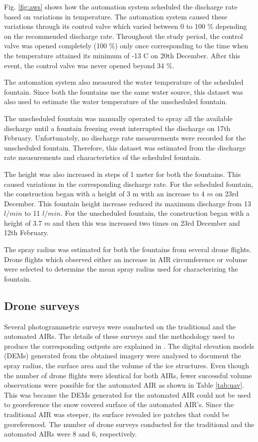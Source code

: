 \documentclass[tc, manuscript]{copernicus}
\begin{document}
Fig. \ref{fig:aws} shows how the automation system scheduled the discharge rate based on variations in
temperature. The automation system caused these variations through its control valve which varied between 0 to
100 \% depending on the recommended discharge rate. Throughout the study period, the control valve was opened
completely (100 \%) only once corresponding to the time when the temperature attained its minimum of -13 \degree
C on 20th December. After this event, the control valve was never opened beyond 34 \%.  

The automation system also measured the water temperature of the scheduled fountain. Since both the fountains
use the same water source, this dataset was also used to estimate the water temperature of the unscheduled
fountain.

The unscheduled fountain was manually operated to spray all the available discharge until a fountain freezing
event interrupted the discharge on 17th February. Unfortunately, no discharge rate measurements were recorded
for the unscheduled fountain. Therefore, this dataset was estimated from the discharge rate measurements and
characteristics of the scheduled fountain.

The height was also increased in steps of 1 meter for both the fountains. This caused variations in the
corresponding discharge rate. For the scheduled fountain, the construction began with a height of 3 m with an
increase to 4 $m$ on 23rd December. This fountain height increase reduced its maximum discharge from
13 $l/min$ to 11 $l/min$. For the unscheduled fountain, the construction began with a height of 3.7 $m$ and then
this was increased two times on 23rd December and 12th February.  

The spray radius was estimated for both the fountains from several drone flights. Drone flights which observed
either an increase in AIR circumference or volume were selected to determine the mean spray radius used for
characterizing the fountain.

\subsection{Drone surveys}

Several photogrammetric surveys were conducted on the traditional and the automated AIRs. The details of these
surveys and the methodology used to produce the corresponding outputs are explained in
\cite{balasubramanianInfluenceMeteorologicalConditions2022}. The digital elevation models (DEMs) generated from
the obtained imagery were analysed to document the spray radius, the surface area and the volume of the ice
structures. Even though the number of drone flights were identical for both AIRs, fewer successful volume
observations were possible for the automated AIR as shown in Table \ref{tab:uav}. This was because the DEMs
generated for the automated AIR could not be used to georeference the snow covered surface of the automated
AIR's. Since the traditional AIR was steeper, its surface revealed ice patches that could be georeferenced. The
number of drone surveys conducted for the traditional and the automated AIRs were 8 and 6, respectively. 
\end{document}
